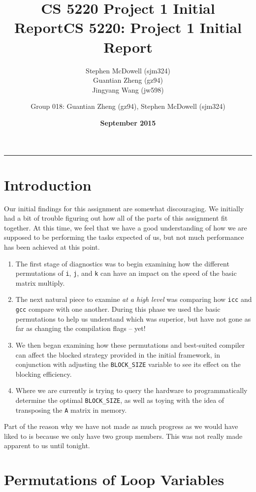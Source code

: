 \documentclass[11pt]{article}
\title{\textbf{CS 5220 Project 1 Initial Report}}
\author{Stephen McDowell (sjm324)\\ Guantian Zheng (gz94)\\ Jingyang Wang (jw598)}
\date{\textbf{September 2015}}
\title{CS 5220: Project 1 Initial Report}
\author{Group 018: Guantian Zheng (gz94), Stephen McDowell (sjm324)}
\makeatletter
\renewcommand{\maketitle}{\bgroup\setlength{\parindent}{0pt}
\begin{flushleft}
  {\Large \textsc{\@title}}\newline
  \textsc{\@author}
  \rule{\textwidth}{1pt}
\end{flushleft}\egroup
}
\makeatother
\begin{document}
\thispagestyle{empty}
\maketitle

\section{Introduction}

Our initial findings for this assignment are somewhat discouraging.  We initially had a bit of trouble figuring out how all of the parts of this assignment fit together.  At this time, we feel that we have a good understanding of how we are supposed to be performing the tasks expected of us, but not much performance has been achieved at this point.

\begin{enumerate}
    \item The first stage of diagnostics was to begin examining how the different permutations of \texttt{i}, \texttt{j}, and \texttt{k} can have an impact on the speed of the basic matrix multiply.

    \item The next natural piece to examine \emph{at a high level} was comparing how \texttt{icc} and \texttt{gcc} compare with one another.  During this phase we used the basic permutations to help us understand which was superior, but have not gone as far as changing the compilation flags -- yet!

    \item We then began examining how these permutations and best-suited compiler can affect the blocked strategy provided in the initial framework, in conjunction with adjusting the \texttt{BLOCK\_SIZE} variable to see its effect on the blocking efficiency.

    \item Where we are currently is trying to query the hardware to programmatically determine the optimal \texttt{BLOCK\_SIZE}, as well as toying with the idea of transposing the \texttt{A} matrix in memory.
\end{enumerate}

Part of the reason why we have not made as much progress as we would have liked to is because we only have two group members.  This was not really made apparent to us until tonight.

\section{Permutations of Loop Variables}
\end{document}
